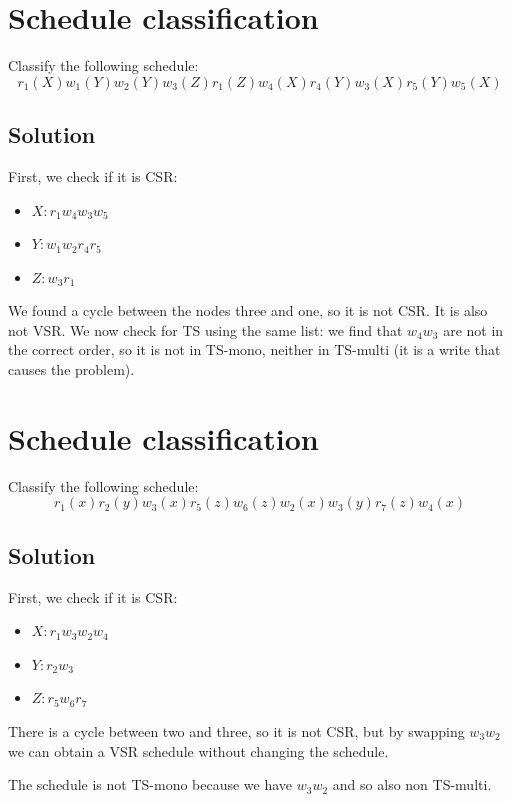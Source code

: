\documentclass[12pt, a4paper]{report}
\newtheorem[style=M,bodystyle=\normalfont]{theorem}{Theorem}
\newtheorem[style=M,bodystyle=\normalfont]{corollary}{Corollary}
\newtheorem[style=M,bodystyle=\normalfont]{lemma}{Lemma}
\newtheorem[style=M,bodystyle=\normalfont]{definition}{Definition}
\begin{document}
    \newpage

    \section{Schedule classification}
        Classify the following schedule:
        \[r_1(X) w_1(Y) w_2(Y) w_3(Z) r_1(Z) w_4(X) r_4(Y) w_3(X) r_5(Y) w_5(X)\] 
    \subsection*{Solution}
        First, we check if it is CSR:
        \begin{itemize}
            \item $X: r_1 w_4 w_3 w_5$
            \item $Y: w_1 w_2 r_4 r_5$
            \item $Z: w_3 r_1$
        \end{itemize}
        We found a cycle between the nodes three and one, so it is not CSR. It is also not VSR. We now check for TS using the same list: 
        we find that $w_4 w_3$ are not in the correct order, so it is not in TS-mono, neither in TS-multi (it is a write that causes the 
        problem).

    \newpage

    \section{Schedule classification}
        Classify the following schedule:
        \[r_1(x) r_2(y) w_3(x) r_5(z) w_6(z) w_2(x) w_3(y) r_7(z) w_4(x)\] 
    \subsection*{Solution}
        First, we check if it is CSR:
        \begin{itemize}
            \item $X: r_1 w_3 w_2 w_4$
            \item $Y: r_2 w_3$
            \item $Z: r_5 w_6 r_7$
        \end{itemize}
        There is a cycle between two and three, so it is not CSR, but by swapping $w_3 w_2$ we can obtain a VSR schedule without changing the 
        schedule. 

        The schedule is not TS-mono because we have $w_3 w_2$ and so also non TS-multi. 
   
    \newpage 
\end{document}
